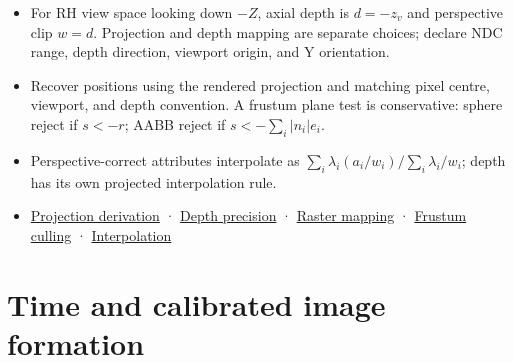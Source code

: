 \begin{itemize}
\tightlist
\item
  For RH view space looking down \(-Z\), axial depth is \(d=-z_v\) and perspective clip \(w=d\). Projection and depth mapping are separate choices; declare NDC range, depth direction, viewport origin, and Y orientation.
\item
  Recover positions using the rendered projection and matching pixel centre, viewport, and depth convention. A frustum plane test is conservative: sphere reject if \(s<-r\); AABB reject if \(s<-\sum_i|n_i|e_i\).
\item
  Perspective-correct attributes interpolate as \(\sum_i\lambda_i(a_i/w_i)/\sum_i\lambda_i/w_i\); depth has its own projected interpolation rule.
\item
  \href{Continuous\%20Notes/Computing\%20Foundations\%20-\%20From\%20Bits\%20to\%20C++\%20and\%20Systems\%20APIs\#Projection\%20turns\%20rays\%20into\%20clip\%20coordinates}{Projection derivation} · \href{Continuous\%20Notes/Computing\%20Foundations\%20-\%20From\%20Bits\%20to\%20C++\%20and\%20Systems\%20APIs\#Depth\%20is\%20a\%20numerical\%20design\%20choice}{Depth precision} · \href{Continuous\%20Notes/Computing\%20Foundations\%20-\%20From\%20Bits\%20to\%20C++\%20and\%20Systems\%20APIs\#A\%20projected\%20point\%20still\%20needs\%20a\%20raster\%20convention}{Raster mapping} · \href{Continuous\%20Notes/Computing\%20Foundations\%20-\%20From\%20Bits\%20to\%20C++\%20and\%20Systems\%20APIs\#The\%20viewing\%20volume\%20is\%20six\%20half-spaces}{Frustum culling} · \href{Continuous\%20Notes/Computing\%20Foundations\%20-\%20From\%20Bits\%20to\%20C++\%20and\%20Systems\%20APIs\#Raster\%20interpolation\%20remembers\%20homogeneous\%20depth}{Interpolation}
\end{itemize}

\section{Time and calibrated image formation}\label{appendix-a2b71a18f5a2-time-and-calibrated-image-formation}

